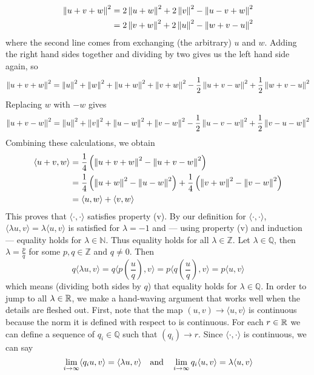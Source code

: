 \documentclass[../../Solutions.tex]{subfiles}
\begin{document}
\begin{itemize}
\begin{enumerate}[(a)]
\begin{equation*}
\begin{split}
			\left\lVert u+v+w\right\rVert^2 & = 2\left\lVert u+w\right\rVert^2+2\left\lVert v\right\rVert^2-\left\lVert u-v+w\right\rVert^2 \\
				& = 2\left\lVert v+w\right\rVert^2+2\left\lVert u\right\rVert^2-\left\lVert w+v-u\right\rVert^2
		\end{split} \end{equation*}
		where the second line comes from exchanging (the arbitrary) $u$ and $w$.
		Adding the right hand sides together and dividing by two gives us the left hand side again, so
		$$ \left\lVert u+v+w\right\rVert^2 = \left\lVert u\right\rVert^2+\left\lVert w\right\rVert^2+\left\lVert u+w\right\rVert^2+\left\lVert v+w\right\rVert^2-\frac{1}{2}\left\lVert u+v-w\right\rVert^2+\frac{1}{2}\left\lVert w+v-u\right\rVert^2 $$
		Replacing $w$ with $-w$ gives
		$$ \left\lVert u+v-w\right\rVert^2 = \left\lVert u\right\rVert^2+\left\lVert v\right\rVert^2+\left\lVert u-w\right\rVert^2+\left\lVert v-w\right\rVert^2-\frac{1}{2}\left\lVert u-v-w\right\rVert^2+\frac{1}{2}\left\lVert v-u-w\right\rVert^2 $$
		Combining these calculations, we obtain
		\begin{equation*} \begin{split} 
			\langle u+v,w \rangle &= \frac{1}{4}\left( \left\lVert u+v+w\right\rVert^2-\left\lVert u+v-w\right\rVert^2 \right) \\
				&= \frac{1}{4}\left(\left\lVert u+w\right\rVert^2-\left\lVert u-w\right\rVert^2\right) + \frac{1}{4}\left(\left\lVert v+w\right\rVert^2-\left\lVert v-w\right\rVert^2\right) \\
				&= \langle u,w \rangle + \langle v,w \rangle
		\end{split} \end{equation*}
		This proves that $\langle\cdot,\cdot\rangle$ satisfies property (v).
		By our definition for $\langle\cdot,\cdot\rangle$, $\langle\lambda u,v \rangle = \lambda\langle u,v \rangle$ is satisfied for $\lambda = -1$ and --- using property (v) and induction --- equality holds for $\lambda \in \mathbb{N}$.
		Thus equality holds for all $\lambda \in \mathbb{Z}$.
		Let $\lambda \in \mathbb{Q}$, then $\lambda = \frac{p}{q}$ for some $p,q \in \mathbb{Z}$ and $q \neq 0$.
		Then
		$$ q \langle \lambda u,v \rangle = q \langle p \left(\frac{u}{q}\right),v \rangle = p \langle q \left(\frac{u}{q}\right),v \rangle = p \langle u,v \rangle $$
		which means (dividing both sides by $q$) that equality holds for $\lambda \in \mathbb{Q}$.
		In order to jump to all $\lambda \in \mathbb{R}$, we make a hand-waving argument that works well when the details are fleshed out.
		First, note that the map $(u,v) \to \langle u,v \rangle$ is continuous because the norm it is defined with respect to is continuous.
		For each $r \in \mathbb{R}$ we can define a sequence of $q_i \in \mathbb{Q}$ such that $(q_i) \to r$.
		Since $\langle\cdot,\cdot\rangle$ is continuous, we can say
		$$ \lim_{i \to \infty} \langle q_i u,v \rangle = \langle \lambda u,v \rangle \text{\quad and\quad}
			\lim_{i \to \infty} q_i \langle u,v \rangle = \lambda \langle u,v \rangle $$

\end{enumerate}
\end{itemize}
\end{document}
